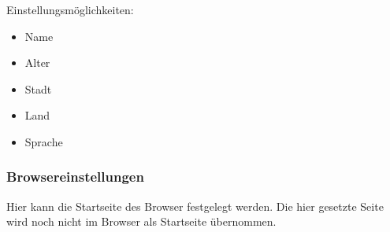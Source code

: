 Einstellungsmöglichkeiten:
\begin{itemize}  
     \item Name  
     \item Alter  
     \item Stadt
     \item Land
     \item Sprache
\end{itemize}

\subsubsection{Browsereinstellungen}  
Hier kann die Startseite des Browser festgelegt werden. Die hier gesetzte Seite wird noch nicht im Browser als Startseite übernommen.